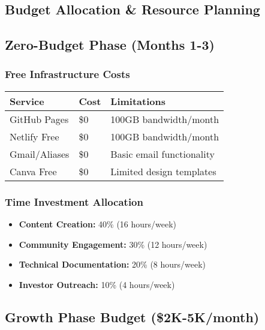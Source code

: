 \documentclass[12pt,a4paper]{article}
\begin{document}
\begin{center}
\section{Budget Allocation \& Resource Planning}

\subsection{Zero-Budget Phase (Months 1-3)}

\subsubsection{Free Infrastructure Costs}
\begin{center}
\begin{tabular}{|l|l|l|}
\hline
\textbf{Service} & \textbf{Cost} & \textbf{Limitations} \\
\hline
GitHub Pages & \$0 & 100GB bandwidth/month \\
\hline
Netlify Free & \$0 & 100GB bandwidth/month \\
\hline
Gmail/Aliases & \$0 & Basic email functionality \\
\hline
Canva Free & \$0 & Limited design templates \\
\hline
\end{tabular}
\end{center}

\subsubsection{Time Investment Allocation}
\begin{itemize}
    \item \textbf{Content Creation:} 40\% (16 hours/week)
    \item \textbf{Community Engagement:} 30\% (12 hours/week)
    \item \textbf{Technical Documentation:} 20\% (8 hours/week)
    \item \textbf{Investor Outreach:} 10\% (4 hours/week)
\end{itemize}

\subsection{Growth Phase Budget (\$2K-5K/month)}


\end{center}
\end{document}
